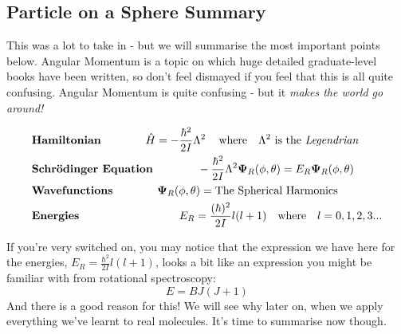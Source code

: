 \documentclass{memoir}[11pt,oneside,a4paper,openany]
\newenvironment{myblock}[1]{%
    \tcolorbox[beamer,%
    noparskip,breakable,
    colback=LightBlue,colframe=DarkBlue,%
    colbacklower=DarkBlue!75!LightBlue,%
    title=#1]}%
    {\endtcolorbox}
\newcommand{\wf}{\ensuremath{\bm{\Psi}}\xspace}
\begin{document}
\subsection{Particle on a Sphere Summary}
This was a lot to take in - but we will summarise the most important points below. Angular Momentum is a topic on which huge detailed graduate-level books have been written, so don't feel dismayed if you feel that this is all quite confusing. Angular Momentum is quite confusing - but it \emph{makes the world go around!}


\begin{myblock}{\begin{center}Particle on a Sphere\end{center}}
	\begin{center}
		\begin{align*} & \text{\textbf{Hamiltonian}} \qquad\qquad \hat{H} = -\frac{\hbar^2}{2I}\Lambda^2 \,\quad  \text{where} \quad \Lambda^2 \,\,\text{is the \emph{Legendrian}} \\
			& \text{\textbf{Schr{\"o}dinger Equation}} \qquad\qquad -\frac{\hbar^2}{2I}\Lambda^2 \wf_R(\phi,\theta) = E_R \wf_R(\phi,\theta) \\
			& \text{\textbf{Wavefunctions}} \qquad\qquad \wf_R(\phi,\theta) = \text{The Spherical Harmonics} \\
			& \text{\textbf{Energies}} \qquad\qquad\qquad\qquad\quad E_R = \frac{(\hbar)^2}{2I}l(l+1) \quad \text{where} \quad l=0,1,2,3...
	\end{align*}
	\end{center}
\end{myblock}

If you're very switched on, you may notice that the expression we have here for the energies, $E_R = \frac{\hbar^2}{2I}l(l+1)$, looks a bit like an expression you might be familiar with from rotational spectroscopy:
\begin{equation}
	E = BJ(J+1)
\end{equation}
And there is a good reason for this! We will see why later on, when we apply everything we've learnt to real molecules. It's time to summarise now though.
\end{document}
